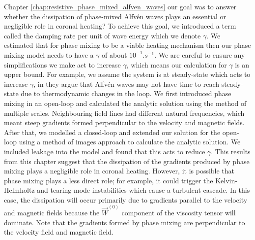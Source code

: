 Chapter \ref{chap:resistive_phase_mixed_alfven_waves} our goal was to answer whether the dissipation of phase-mixed Alfv\'en waves plays an essential or negligible role in coronal heating? To achieve this goal, we introduced a term called the damping rate per unit of wave energy which we denote $\gamma$. We estimated that for phase mixing to be a viable heating mechanism then our phase mixing model needs to have a $\gamma$ of about $10^{-1}\si{.s^{-1}}$. We are careful to ensure any simplifications we make act to increase $\gamma$, which means our calculation for $\gamma$ is an upper bound. For example, we assume the system is at steady-state which acts to increase $\gamma$, in \citet{Arregui2015} they argue that Alfv\'en waves may not have time to reach steady-state due to thermodynamic changes in the loop. We first introduced phase mixing in an open-loop and calculated the analytic solution using the method of multiple scales. Neighbouring field lines had different natural frequencies, which meant steep gradients formed perpendicular to the velocity and magnetic fields. After that, we modelled a closed-loop and extended our solution for the open-loop using a method of images approach to calculate the analytic solution. We included leakage into the model and found that this acts to reduce $\gamma$. This results from this chapter suggest that the dissipation of the gradients produced by phase mixing plays a negligible role in coronal heating. However, it is possible that phase mixing plays a less direct role; for example, it could trigger the Kelvin-Helmholtz and tearing mode instabilities which cause a turbulent cascade. In this case, the dissipation will occur primarily due to gradients parallel to the velocity and magnetic fields because the $\vec{W}^{(0)}$ component of the viscosity tensor will dominate. Note that the gradients formed by phase mixing are perpendicular to the velocity field and magnetic field.


